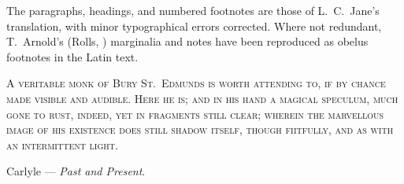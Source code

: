 \documentclass{book}
\begin{document}
{\begin{center}
\vfill
\hspace{0pt}

\end{center}


\cleardoublepage

\begin{center}

\hspace{0cm}\vspace{1.4cm}

\parbox{8cm}{

\begin{center}
\end{center}

\vspace{.5cm}
{
The paragraphs, headings, and numbered footnotes are those of L.\ C.\ Jane's  translation, with minor typographical errors corrected. Where not redundant, T.\ Arnold's (Rolls, ) marginalia and notes have been reproduced as obelus footnotes in the Latin text.
}
}

\end{center}







\cleardoublepage

\begin{center}


\hspace{0cm}\vspace{1.4cm}

\parbox{8cm}{
{\scshape
A veritable monk of Bury St.\ Edmunds is worth attending to, if by chance made visible and audible. Here he is; and in his hand a magical speculum, much gone to rust, indeed, yet in fragments still clear; wherein the marvellous image of his existence does still shadow itself, though f\vphantom iitfully, and as with an intermittent light.\\
}

\hspace{0pt}\hfill Carlyle --- \emph{Past and Present}.
}

\end{center}

\vspace{1cm}

{

}}
\end{document}

